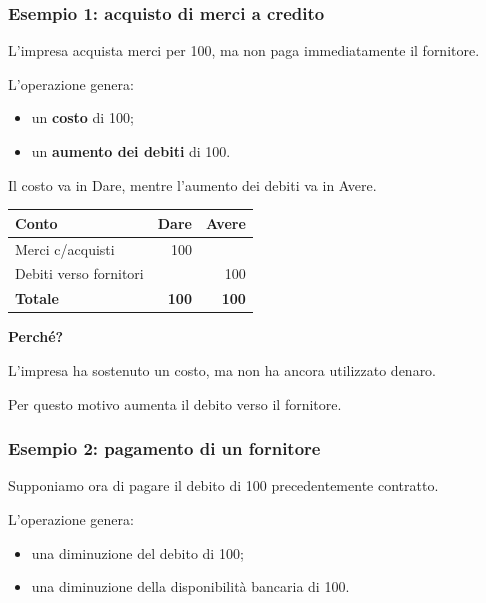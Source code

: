 \subsubsection*{Esempio 1: acquisto di merci a credito}

\noindent L'impresa acquista merci per 100,
ma non paga immediatamente il fornitore.

\medskip

\noindent L'operazione genera:

\begin{itemize}
    \item un \textbf{costo} di 100;
    \item un \textbf{aumento dei debiti} di 100.
\end{itemize}

\noindent Il costo va in Dare, mentre l'aumento
dei debiti va in Avere.

\begin{center}
\begin{tabular}{|l|r|r|}
\hline
\textbf{Conto} & \textbf{Dare} & \textbf{Avere} \\
\hline
Merci c/acquisti & 100 & \\
\hline
Debiti verso fornitori & & 100 \\
\hline
\textbf{Totale} & \textbf{100} & \textbf{100} \\
\hline
\end{tabular}
\end{center}

\noindent \textbf{Perché?}

\noindent L'impresa ha sostenuto un costo,
ma non ha ancora utilizzato denaro.

\medskip

\noindent Per questo motivo aumenta il debito
verso il fornitore.


\subsubsection*{Esempio 2: pagamento di un fornitore}

\noindent Supponiamo ora di pagare il debito
di 100 precedentemente contratto.

\medskip

\noindent L'operazione genera:

\begin{itemize}
    \item una diminuzione del debito di 100;
    \item una diminuzione della disponibilità
    bancaria di 100.
\end{itemize}

